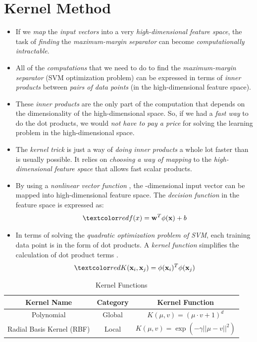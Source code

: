 \documentclass[
	number={2},
	title={Learning Linear Separators{,} SVMs and Kernels}
]{cs584notes}
\begin{document}
\section{Kernel Method}\label{sec:kernel-method}
\begin{itemize}
	\item If we \emph{map} the \emph{input vectors} into a very \emph{high-dimensional feature space}, the task of \emph{finding} the \emph{maximum-margin separator} can become \emph{computationally intractable}.
	\item All of the \emph{computations} that we need to do to find the \emph{maximum-margin separator} (SVM optimization problem) can be expressed in terms of \emph{inner products} between \emph{pairs of data points} (in the high-dimensional feature space).
	\item These \emph{inner products} are the only part of the computation that depends on the dimensionality of the high-dimensional space.
	So, if we had a \emph{fast way} to do the dot products, we would \emph{not have to pay a price} for solving the learning problem in the high-dimensional space.
	\item The \emph{kernel trick} is just a way of \emph{doing inner products} a whole lot faster than is usually possible.
	It relies on \emph{choosing a way of mapping} to the \emph{high-dimensional feature space} that allows fast scalar products.
	\item By using a \emph{nonlinear vector function} , the -dimensional input vector  can be mapped into high-dimensional feature space.
	The \emph{decision function} in the feature space is expressed as:
	\[ \data{ f(x) = \vec{w}^{T}\phi(\vec{x}) + b } \]
	\item In terms of solving the \emph{quadratic optimization problem of SVM}, each training data point is in the form of dot products.
	A \emph{kernel function}  simplifies the calculation of dot product terms .
	\[ \data{K(\vec{x}_{i}, \vec{x}_{j}) = \phi(\vec{x}_{i})^{T} \phi(\vec{x}_{j})} \]
\end{itemize}

\begin{table}[H]
	\centering
	\caption{Kernel Functions}
	\label{tab:kernel-fucntions}
	\begin{tabular}{|c|c|c|}
		\hline
		\textbf{Kernel Name} & \textbf{Category} & \textbf{Kernel Function}\\
		\hline
		Polynomial & Global & $K(\mu, v) = (\mu \cdot v + 1)^{d}$\\
		\hline
		Radial Basis Kernel (RBF) & Local & $K(\mu, v) = \exp( -\gamma || \mu - v ||^{2} )$\\
		\hline
	\end{tabular}
\end{table}
\end{document}
